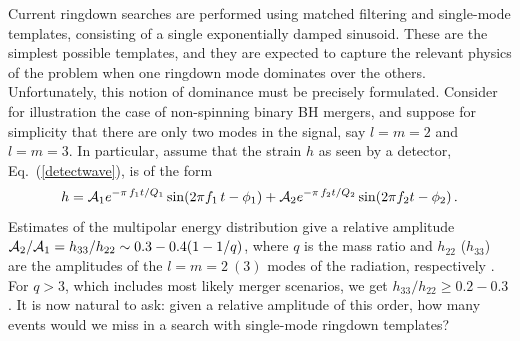 \documentclass[]{iopart}
\def\be{\begin{equation}}
\def\ee{\end{equation}}
\begin{document}
Current ringdown searches are performed using matched filtering and
single-mode templates, consisting of a single exponentially damped
sinusoid. These are the simplest possible templates, and they are expected to
capture the relevant physics of the problem when one ringdown mode dominates
over the others.  Unfortunately, this notion of dominance must be precisely
formulated. Consider for illustration the case of non-spinning binary BH
mergers, and suppose for simplicity that there are only two modes in the
signal, say $l=m=2$ and $l=m=3$.  In particular, assume that the strain $h$ as
seen by a detector, Eq.~(\ref{detectwave}), is of the form
%
\be
h=
{\cal A}_1e^{-\pi\,f_1t/Q_1}\sin(2\pi f_1\,t-\phi_1)+
{\cal A}_2e^{-\pi\,f_2t/Q_2}\sin(2\pi f_2 t-\phi_2)\,.
\label{htwomode}
\ee
%
Estimates of the multipolar energy distribution give a relative amplitude
${\cal A}_2/{\cal A}_1=h_{33}/h_{22}\sim 0.3-0.4(1-1/q)$, where $q$ is the
mass ratio and $h_{22}$ ($h_{33}$) are the amplitudes of the $l=m=2~(3)$ modes
of the radiation, respectively \cite{Berti:2007fi}. For $q>3$, which includes
most likely merger scenarios, we get $h_{33}/h_{22}\geq 0.2-0.3$.  It is now
natural to ask: given a relative amplitude of this order, how many events
would we miss in a search with single-mode ringdown templates?
\end{document}
